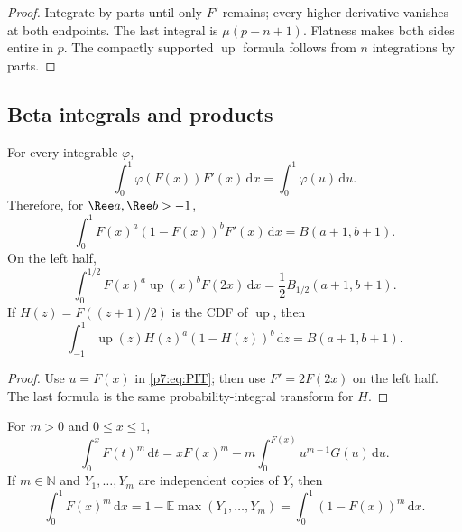 \documentclass[11pt,oneside]{article}
\theoremstyle{definition}
\theoremstyle{remark}
\newcommand{\Up}{\operatorname{up}}
\newcommand{\E}{\mathbb E}
\newcommand{\N}{\mathbb N}
\newcommand{\dd}{\,\mathrm d}
\newcommand{\1}{\mathbf 1}
\begin{document}
\begin{proof}
Integrate by parts until only $F'$ remains; every higher derivative vanishes at both endpoints.
The last integral is $\mu(p-n+1)$.  Flatness makes both sides entire in $p$.  The compactly
supported $\Up$ formula follows from $n$ integrations by parts.
\end{proof}

\subsection{Beta integrals and products}

\begin{proposition}
\label{p7:prop:beta-family}
For every integrable $\varphi$,
\begin{equation}
 \int_0^1\varphi(F(x))F'(x)\dd x=\int_0^1\varphi(u)\dd u.
 \label{p7:eq:PIT}
\end{equation}
Therefore, for $\Ree a,\Ree b>-1$,
\begin{equation}
 \int_0^1F(x)^a(1-F(x))^bF'(x)\dd x
 =B(a+1,b+1).
 \label{p7:eq:beta-F}
\end{equation}
On the left half,
\begin{equation}
 \int_0^{1/2}F(x)^a\Up(x)^bF(2x)\dd x
 =\frac12B_{1/2}(a+1,b+1).
 \label{p7:eq:incomplete-beta-left}
\end{equation}
If $H(z)=F((z+1)/2)$ is the CDF of $\Up$, then
\begin{equation}
 \int_{-1}^{1}\Up(z)H(z)^a(1-H(z))^b\dd z
 =B(a+1,b+1).
 \label{p7:eq:beta-up-CDF}
\end{equation}
\end{proposition}

\begin{proof}
Use $u=F(x)$ in \cref{p7:eq:PIT}; then use $F'=2F(2x)$ on the left half.  The last formula is
the same probability-integral transform for $H$.
\end{proof}

\begin{proposition}
\label{p7:prop:CDF-powers}
For $m>0$ and $0\le x\le1$,
\begin{equation}
 \int_0^xF(t)^m\dd t
 =xF(x)^m-m\int_0^{F(x)}u^{m-1}G(u)\dd u.
 \label{p7:eq:CDF-power-primitive}
\end{equation}
If $m\in\N$ and $Y_1,\ldots,Y_m$ are independent copies of $Y$, then
\begin{equation}
 \int_0^1F(x)^m\dd x
 =1-\E\max(Y_1,\ldots,Y_m)
 =\int_0^1(1-F(x))^m\dd x.
 \label{p7:eq:CDF-power-order-stat}
\end{equation}
\end{proposition}
\end{document}
